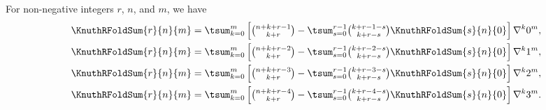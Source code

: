\begin{example}
  For non-negative integers $r$, $n$, and $m$, we have
  \begin{align*}
    \KnuthRFoldSum{r}{n}{m}
    &=
    \tsum_{k=0}^{m}
    \left[
      \tbinom{n+k+r-1}{k+r}
      -
      \tsum_{s=0}^{r-1}
      \tbinom{k+r-1-s}{k+r-s}
      \KnuthRFoldSum{s}{n}{0}
    \right]
    \nabla^k 0^m,
    \\
    \KnuthRFoldSum{r}{n}{m}
    &=
    \tsum_{k=0}^{m}
    \left[
      \tbinom{n+k+r-2}{k+r}
      -
      \tsum_{s=0}^{r-1}
      \tbinom{k+r-2-s}{k+r-s}
      \KnuthRFoldSum{s}{n}{0}
    \right]
    \nabla^k 1^m,
    \\
    \KnuthRFoldSum{r}{n}{m}
    &=
    \tsum_{k=0}^{m}
    \left[
      \tbinom{n+k+r-3}{k+r}
      -
      \tsum_{s=0}^{r-1}
      \tbinom{k+r-3-s}{k+r-s}
      \KnuthRFoldSum{s}{n}{0}
    \right]
    \nabla^k 2^m,
    \\
    \KnuthRFoldSum{r}{n}{m}
    &=
    \tsum_{k=0}^{m}
    \left[
      \tbinom{n+k+r-4}{k+r}
      -
      \tsum_{s=0}^{r-1}
      \tbinom{k+r-4-s}{k+r-s}
      \KnuthRFoldSum{s}{n}{0}
    \right]
    \nabla^k 3^m.
  \end{align*}
\end{example}
